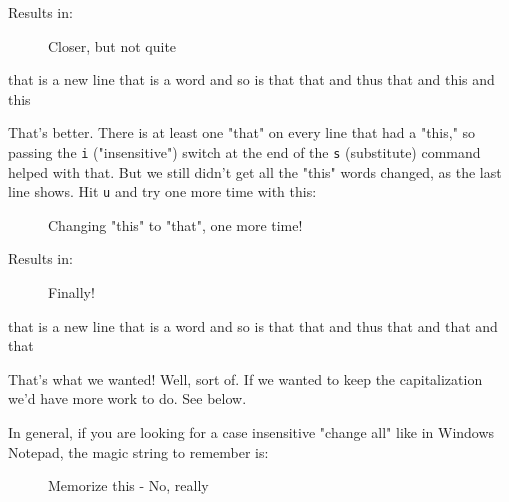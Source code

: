 \documentclass[10pt,american,]{book}
\newenvironment{Shaded}{\begin{snugshade}}{\end{snugshade}}
\newcommand{\KeywordTok}[1]{\textcolor[rgb]{0.13,0.29,0.53}{\textbf{{#1}}}}
\newcommand{\OtherTok}[1]{\textcolor[rgb]{0.56,0.35,0.01}{{#1}}}
\newcommand{\NormalTok}[1]{{#1}}
\numberwithin{figure}{chapter}
\DeclareRobustCommand{\drcap}[1]{\begin{figure}[H]\caption{#1}\end{figure}}
\renewcommand{\KeywordTok}[1]{{#1}}
\renewcommand{\OtherTok}[1]{{#1}}
\renewcommand{\NormalTok}[1]{{#1}}
\begin{document}
Results in:

\drcap{Closer, but not quite}

\begin{Shaded}
\begin{Highlighting}[]
\KeywordTok{that} \NormalTok{is a new line}
\KeywordTok{that} \NormalTok{is a word}
\KeywordTok{and} \NormalTok{so is that}
\KeywordTok{that} \NormalTok{and thus}
\KeywordTok{that} \NormalTok{and this and this}
\end{Highlighting}
\end{Shaded}

That's better. There is at least one "that" on every line that had a
"this," so passing the \texttt{i} ("insensitive") switch at the end of
the \texttt{s} (substitute) command helped with that. But we still
didn't get all the "this" words changed, as the last line shows. Hit
\texttt{u} and try one more time with this:

\drcap{Changing "this" to "that", one more time!}

\begin{Shaded}
\end{Shaded}

Results in:

\drcap{Finally!}

\begin{Shaded}
\begin{Highlighting}[]
\KeywordTok{that} \NormalTok{is a new line}
\KeywordTok{that} \NormalTok{is a word}
\KeywordTok{and} \NormalTok{so is that}
\KeywordTok{that} \NormalTok{and thus}
\KeywordTok{that} \NormalTok{and that and that}
\end{Highlighting}
\end{Shaded}

That's what we wanted! Well, sort of. If we wanted to keep the
capitalization we'd have more work to do. See below.

In general, if you are looking for a case insensitive "change all" like
in Windows Notepad, the magic string to remember is:

\drcap{Memorize this - No, really}

\begin{Shaded}
\end{Shaded}
\end{document}
